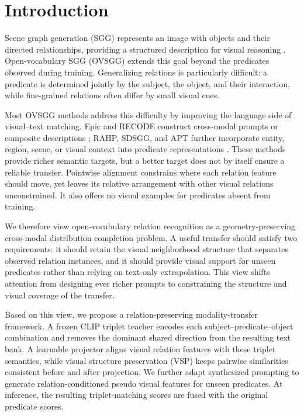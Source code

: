 \section{Introduction}
\label{sec:intro}

Scene graph generation (SGG) represents an image with objects and their
directed relationships, providing a structured description for visual
reasoning \cite{xu2017scenegraph}. Open-vocabulary SGG (OVSGG) extends this
goal beyond the predicates observed during training. Generalizing relations is
particularly difficult: a predicate is determined jointly by the subject, the
object, and their interaction, while fine-grained relations often differ by
small visual cues.

Most OVSGG methods address this difficulty by improving the language side of
visual--text matching. Epic and RECODE construct cross-modal prompts or
composite descriptions \cite{yu2023epic,li2023recode}; RAHP, SDSGG, and APT
further incorporate entity, region, scene, or visual context into predicate
representations \cite{liu2025rahp,chen2024sdsgg,luo2026apt}. These methods
provide richer semantic targets, but a better target does not by itself ensure
a reliable transfer. Pointwise alignment constrains where each relation feature
should move, yet leaves its relative arrangement with other visual relations
unconstrained. It also offers no visual examples for predicates absent from
training.

We therefore view open-vocabulary relation recognition as a
geometry-preserving cross-modal distribution completion problem. A useful
transfer should satisfy two requirements: it should retain the visual
neighborhood structure that separates observed relation instances, and it
should provide visual support for unseen predicates rather than relying on
text-only extrapolation. This view shifts attention from designing ever richer
prompts to constraining the structure and visual coverage of the transfer.

Based on this view, we propose a relation-preserving modality-transfer
framework. A frozen CLIP triplet teacher \cite{radford2021clip} encodes each
subject--predicate--object combination and removes the dominant shared direction
from the resulting text bank. A learnable projector aligns visual relation
features with these triplet semantics, while visual structure preservation
(VSP) keeps pairwise similarities consistent before and after projection. We
further adapt synthesized prompting \cite{wang2023ship} to generate
relation-conditioned pseudo visual features for unseen predicates. At
inference, the resulting triplet-matching scores are fused with the original
predicate scores.

